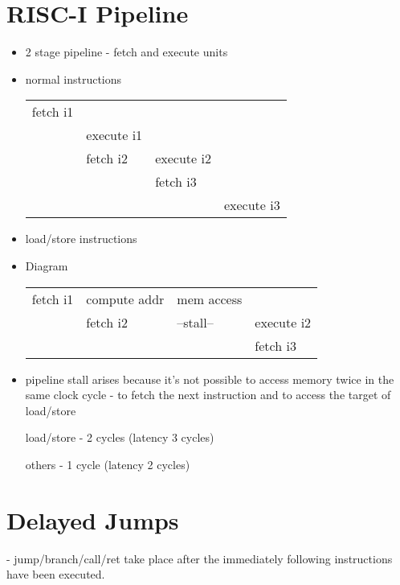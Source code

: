 \documentclass[a4paper,12pt]{article}
\begin{document}
\section*{RISC-I Pipeline}

\begin{itemize}

\item 2 stage pipeline - fetch and execute units

\item normal instructions \\


\begin{tabular}{l|l|l|l}
fetch i1		&					&					&					\\
				&	execute i1	&					&					\\
				&	fetch i2		&	execute i2	&					\\
				&					&	fetch i3		&					\\
				&					&					&	execute i3	\\
\end{tabular}

\item load/store instructions

\item Diagram

\begin{tabular}{l|l|l|l}
fetch i1		&	compute addr	& mem access	&					\\
				&	fetch i2			&	--stall--	&	execute i2	\\
				&						&					&	fetch i3		\\
\end{tabular}


\item pipeline stall arises because it's not possible to access memory
twice in the same clock cycle - to fetch the next instruction and to
access the target of load/store

\subitem load/store - 2 cycles (latency 3 cycles)

\subitem others - 1 cycle (latency 2 cycles)

\end{itemize}

\section*{Delayed Jumps}

- jump/branch/call/ret take place after the immediately following
  instructions have been executed.
\end{document}
